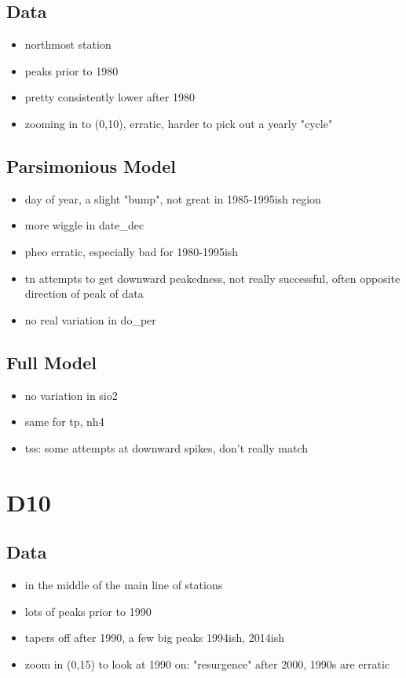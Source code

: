 \documentclass[12pt]{amsart}
\begin{document}
\subsection{Data}
\begin{itemize}
\item northmost station
\item peaks prior to 1980
\item pretty consistently lower after 1980
\item zooming in to (0,10), erratic, harder to pick out a yearly "cycle"
\end{itemize}
\subsection{Parsimonious Model}
\begin{itemize}
\item day of year, a slight "bump", not great in 1985-1995ish region
\item more wiggle in date_dec
\item pheo erratic, especially bad for 1980-1995ish
\item tn attempts to get downward peakedness, not really successful, often opposite direction of peak of data
\item no real variation in do_per
\end{itemize}
\subsection{Full Model}

\begin{itemize}
\item no variation in sio2
\item same for tp, nh4
\item tss: some attempts at downward spikes, don't really match
\end{itemize}

\section{D10}
\subsection{Data}
\begin{itemize}
\item in the middle of the main line of stations
\item lots of peaks prior to 1990
\item tapers off after 1990, a few big peaks 1994ish, 2014ish
\item zoom in (0,15) to look at 1990 on: "resurgence" after 2000, 1990s are erratic
\end{itemize}
\end{document}
